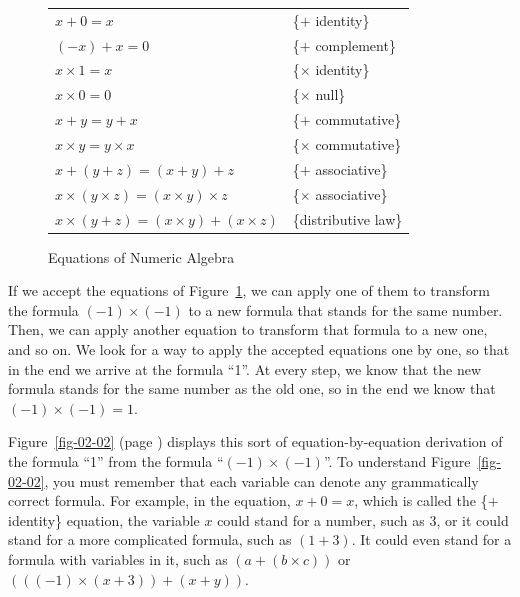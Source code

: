 \begin{figure}
\begin{center}
\begin{tabular}{ll}
$x+0 = x$                 & \{$+$ identity\} \\
$(-x)+ x = 0$             & \{$+$ complement\} \\
$x \times 1 = x$          & \{$\times$ identity\} \\
$x \times 0 = 0$          & \{$\times$ null\} \\
$x+y = y+x$               & \{$+$ commutative\} \\
$x \times y = y \times x$ & \{$\times$ commutative\} \\
$x+(y+z) = (x+y)+z$       & \{$+$ associative\} \\
$x \times (y \times z) = (x \times y) \times z$ & \{$\times$ associative\} \\
$x\times(y+z) = (x \times y)+(x \times z)$      & \{distributive law\} \\
\end{tabular}
\end{center}
\caption{Equations of Numeric Algebra}
\label{fig-02-01}
\end{figure}

If we accept the equations of Figure~\ref{fig-02-01},
we can apply one of them to transform the formula $(-1)\times(-1)$ to a new formula that
stands for the same number. Then, we can apply another equation to
transform that formula to a new one, and so on.
We look for a way to apply the
accepted equations one by one, so that in the end we
arrive at the formula ``1''. At every step, we know that the
new formula stands for the same number as the old one, so in
the end we know that $(-1)\times(-1) = 1$.

Figure~\ref{fig-02-02} (page \pageref{fig-02-02})
displays this sort of equation-by-equation derivation of the
formula ``1'' from the formula ``$(-1)\times(-1)$''. To
understand Figure~\ref{fig-02-02}, you must remember that each
variable can denote any
grammatically correct formula. For example, in the
equation, $x + 0 = x$,
which is called the \{$+$ identity\} equation,
the variable $x$ could stand for a number,
such as 3, or it could stand for a more complicated
formula, such as $(1 + 3)$. It could even stand for a formula
with variables in it, such as $(a + (b \times c))$ or
$(((-1) \times (x + 3)) + (x + y))$.

